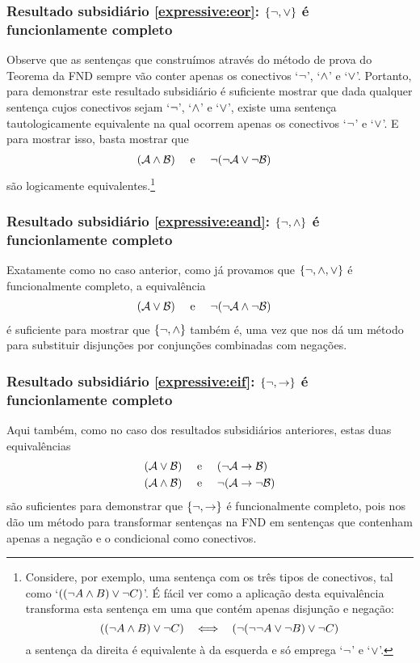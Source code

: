 \subsubsection{Resultado subsidiário \ref{expressive:eor}: $\{\neg, \vee \}$ é funcionlamente completo}	
Observe que as sentenças que construímos através do método de prova do Teorema da FND sempre vão conter apenas os conectivos `$\neg$', `$\wedge$' e `$\vee$'.
Portanto, para demonstrar este resultado subsidiário é suficiente mostrar que dada qualquer sentença cujos conectivos sejam `$\neg$', `$\wedge$' e `$\vee$', existe uma sentença tautologicamente equivalente na qual ocorrem apenas os conectivos `$\neg$' e `$\vee$'.
E para mostrar isso, basta mostrar que
		\begin{align*}
		(\mathcal{A} \wedge \mathcal{B}) & \text{\quad \ e \quad} \neg(\neg \mathcal{A} \vee\neg \mathcal{B})
		\end{align*}
		são logicamente equivalentes.\footnote{
			Considere, por exemplo, uma sentença com os três tipos de conectivos, tal como `$((\neg A \wedge B) \vee \neg C)$'.
			É fácil ver como a aplicação desta equivalência transforma esta sentença em uma que contém apenas disjunção e negação:
			$$((\enot A \eand B) \eor \enot C) \ \ \iff \ \ (\enot(\enot\enot A \eor\enot B) \eor \enot C)$$
			a sentença da direita é equivalente à da esquerda e só emprega `$\neg$' e `$\vee$'.}

\subsubsection{Resultado subsidiário \ref{expressive:eand}: $\{\neg, \wedge \}$ é funcionlamente completo}
Exatamente como no caso anterior, como já provamos que $\{ \neg, \wedge, \vee\}$ é funcionalmente completo, a equivalência 
		\begin{align*}
		(\mathcal{A} \vee \mathcal{B}) & \text{\quad \ e \quad}\neg(\neg \mathcal{A} \wedge\neg \mathcal{B})
		\end{align*}
é suficiente para mostrar que $\{ \neg, \wedge\}$ também é, uma vez que nos dá um método para substituir disjunções por conjunções combinadas com negações.

\subsubsection{Resultado subsidiário \ref{expressive:eif}: $\{\neg, \rightarrow \}$ é funcionlamente completo}
Aqui também, como no caso dos resultados subsidiários anteriores, estas duas equivalências 
		\begin{align*}
		(\mathcal{A} \vee \mathcal{B}) &\text{\quad \ e \quad} (\neg \mathcal{A} \rightarrow \mathcal{B})\\
		(\mathcal{A} \wedge \mathcal{B}) &\text{\quad \ e \quad} \neg(\mathcal{A} \rightarrow \neg\mathcal{B})
		\end{align*}
são suficientes para demonstrar que $\{ \neg, \rightarrow\}$ é funcionalmente completo, pois nos dão um método para transformar sentenças na FND em sentenças que contenham apenas a negação e o condicional como conectivos.

